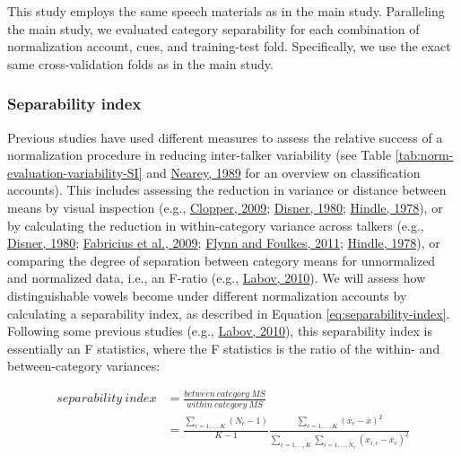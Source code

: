 \documentclass[utf8]{frontiers_suppmat} %
\begin{document}
This study employs the same speech materials as in the main study. Paralleling the main study, we evaluated category separability for each combination of normalization account, cues, and training-test fold. Specifically, we use the exact same cross-validation folds as in the main study.

\hypertarget{sec:separabilityIndex}{%
\subsubsection{Separability index}\label{sec:separabilityIndex}}

Previous studies have used different measures to assess the relative success of a normalization procedure in reducing inter-talker variability (see Table \ref{tab:norm-evaluation-variability-SI} and \protect\hyperlink{ref-nearey1989}{Nearey, 1989} for an overview on classification accounts). This includes assessing the reduction in variance or distance between means by visual inspection (e.g., \protect\hyperlink{ref-clopper2009}{Clopper, 2009}; \protect\hyperlink{ref-disner1980}{Disner, 1980}; \protect\hyperlink{ref-hindle1978}{Hindle, 1978}), or by calculating the reduction in within-category variance across talkers (e.g., \protect\hyperlink{ref-disner1980}{Disner, 1980}; \protect\hyperlink{ref-fabricius2009}{Fabricius et al., 2009}; \protect\hyperlink{ref-Flynn2011}{Flynn and Foulkes, 2011}; \protect\hyperlink{ref-hindle1978}{Hindle, 1978}), or comparing the degree of separation between category means for unnormalized and normalized data, i.e., an F-ratio (e.g., \protect\hyperlink{ref-labov2010}{Labov, 2010}). We will assess how distinguishable vowels become under different normalization accounts by calculating a separability index, as described in Equation \eqref{eq:separability-index}. Following some previous studies (e.g., \protect\hyperlink{ref-labov2010}{Labov, 2010}), this separability index is essentially an F statistics, where the F statistics is the ratio of the within- and between-category variances:

\begin{equation}\label{eq:separability-index}
\begin{split}
 separability\ index &= \frac{between\ category\ MS}{within\ category\ MS}\\
 &= \frac{\sum\limits_{c=1,\ldots,K}(N_{c}-1)}{K-1}\frac{\sum\limits_{c=1,\ldots,K}(\bar{x}_{c}-\bar{x})^{2}}{\sum\limits_{c=1,\ldots,K} \sum\limits_{i=1,\ldots,N_{c}}(x_{i,c}-\bar{x}_{c})^{2}}
\end{split}
\end{equation}
\end{document}
